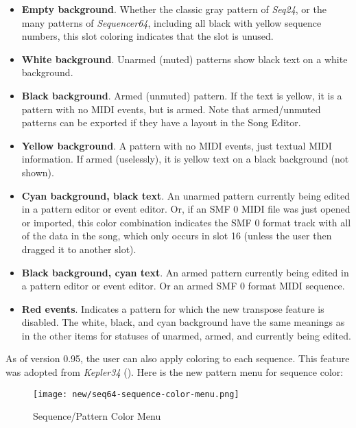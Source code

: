    \begin{itemize}
      \item \textbf{Empty background}.  Whether the classic gray pattern
         of \textsl{Seq24}, or the many patterns of \textsl{Sequencer64},
         including all black with yellow sequence numbers, this
         slot coloring indicates that the slot is unused.
      \item \textbf{White background}.  Unarmed (muted) patterns show black
         text on a white background.
      \item \textbf{Black background}.  Armed (unmuted) pattern.  If the text
         is yellow, it is a pattern with no MIDI events, but is armed.  Note
         that armed/unmuted patterns can be exported if they have a layout in
         the Song Editor.
      \item \textbf{Yellow background}.  A pattern with no MIDI events, just
         textual MIDI information.  If armed (uselessly), it is yellow text on
         a black background (not shown).
      \item \textbf{Cyan background, black text}.
         An unarmed pattern currently being edited in a pattern editor or event
         editor. Or, if an SMF 0 MIDI file was just opened or imported, this
         color combination indicates the SMF 0 format track with all of the
         data in the song, which only occurs in slot 16 (unless the user then
         dragged it to another slot).
      \item \textbf{Black background, cyan text}.
         An armed pattern currently being edited in a pattern editor or event
         editor.  Or an armed SMF 0 format MIDI sequence.
      \item \textbf{Red events}.
         Indicates a pattern for which the new transpose feature is
         disabled.  The white, black, and cyan background have the same
         meanings as in the other items for statuses of unarmed, armed, and
         currently being edited.
   \end{itemize}

   As of version 0.95, the user can also apply coloring to each sequence.
   This feature was adopted from \textsl{Kepler34} (\cite{kepler34}).
   Here is the new pattern menu for sequence color:

\begin{figure}[H]
   \centering 
   \texttt{[image: new/seq64-sequence-color-menu.png]}
   \caption{Sequence/Pattern Color Menu}
   \label{fig:pattern_window_sequence_color_menu}
\end{figure}

